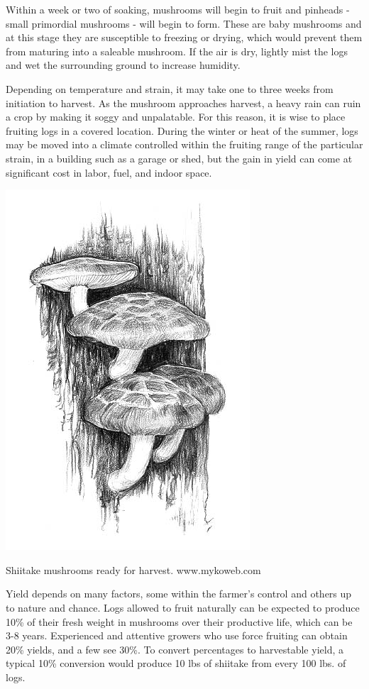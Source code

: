 \documentclass{tufte-handout}
\begin{document}
Within a week or two of soaking, mushrooms will begin to fruit and pinheads - small primordial mushrooms - will begin to form. These are baby mushrooms and at this stage they are susceptible to freezing or drying, which would prevent them from maturing into a saleable mushroom. 
If the air is dry, lightly mist the logs and wet the surrounding ground to increase humidity.

Depending on temperature and strain, it may take one to three weeks from initiation to harvest. 
As the mushroom approaches harvest, a heavy rain can ruin a crop by making it soggy and unpalatable. 
For this reason, it is wise to place fruiting logs in a covered location. 
During the winter or heat of the summer, logs may be moved into a climate controlled within the fruiting range of the particular strain, in a building such as a garage or shed, but the gain in yield can come at significant cost in labor, fuel, and indoor space.

\begin{marginfigure}
\includegraphics{shiitake}
\caption{Shiitake mushrooms ready for harvest. www.mykoweb.com}
\end{marginfigure}


Yield depends on many factors, some within the farmer’s control and others up to nature and chance. 
Logs allowed to fruit naturally can be expected to produce 10\% of their fresh weight in mushrooms over their productive life, which can be 3-8 years. 
Experienced and attentive growers who use force fruiting can obtain 20\% yields, and a few see 30\%. 
To convert percentages to harvestable yield, a typical 10\% conversion would produce 10 lbs of shiitake from every 100 lbs. of logs.
\end{document}
